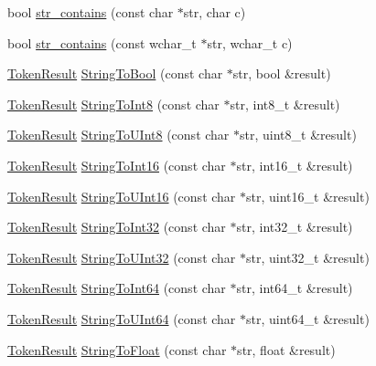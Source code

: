\begin{DoxyCompactItemize}
bool \hyperlink{namespacemage_a42025161321117689362691b52994c3f}{str\+\_\+contains} (const char $\ast$str, char c)
\item 
bool \hyperlink{namespacemage_a95501f17ace9d4f4ca8ed15e2559ad23}{str\+\_\+contains} (const wchar\+\_\+t $\ast$str, wchar\+\_\+t c)
\item 
\hyperlink{namespacemage_a2178ba2411db5912f41b2e7698c2037d}{Token\+Result} \hyperlink{namespacemage_a4936774f925ba96c5b8d37c5e54cca02}{String\+To\+Bool} (const char $\ast$str, bool \&result)
\item 
\hyperlink{namespacemage_a2178ba2411db5912f41b2e7698c2037d}{Token\+Result} \hyperlink{namespacemage_ab7990acb6c8fb8e5eb578ef173e601f9}{String\+To\+Int8} (const char $\ast$str, int8\+\_\+t \&result)
\item 
\hyperlink{namespacemage_a2178ba2411db5912f41b2e7698c2037d}{Token\+Result} \hyperlink{namespacemage_ad3cfd1fdffefa1f3f793b7612de11770}{String\+To\+U\+Int8} (const char $\ast$str, uint8\+\_\+t \&result)
\item 
\hyperlink{namespacemage_a2178ba2411db5912f41b2e7698c2037d}{Token\+Result} \hyperlink{namespacemage_a5889574dc8d73ffa614ad8541e0b312a}{String\+To\+Int16} (const char $\ast$str, int16\+\_\+t \&result)
\item 
\hyperlink{namespacemage_a2178ba2411db5912f41b2e7698c2037d}{Token\+Result} \hyperlink{namespacemage_aa1be9dbfa0799457b0de019d451cd5ca}{String\+To\+U\+Int16} (const char $\ast$str, uint16\+\_\+t \&result)
\item 
\hyperlink{namespacemage_a2178ba2411db5912f41b2e7698c2037d}{Token\+Result} \hyperlink{namespacemage_a805f1cf7436782f77b49085194451d07}{String\+To\+Int32} (const char $\ast$str, int32\+\_\+t \&result)
\item 
\hyperlink{namespacemage_a2178ba2411db5912f41b2e7698c2037d}{Token\+Result} \hyperlink{namespacemage_ac4f6357454f6870506e0fc102b745281}{String\+To\+U\+Int32} (const char $\ast$str, uint32\+\_\+t \&result)
\item 
\hyperlink{namespacemage_a2178ba2411db5912f41b2e7698c2037d}{Token\+Result} \hyperlink{namespacemage_a9134bbf3717893628e324fcf83e203a0}{String\+To\+Int64} (const char $\ast$str, int64\+\_\+t \&result)
\item 
\hyperlink{namespacemage_a2178ba2411db5912f41b2e7698c2037d}{Token\+Result} \hyperlink{namespacemage_a9ed31e3340a769a654f1f819c368bb6d}{String\+To\+U\+Int64} (const char $\ast$str, uint64\+\_\+t \&result)
\item 
\hyperlink{namespacemage_a2178ba2411db5912f41b2e7698c2037d}{Token\+Result} \hyperlink{namespacemage_a9353f738019573cfa93e504978bf6584}{String\+To\+Float} (const char $\ast$str, float \&result)

\end{DoxyCompactItemize}
